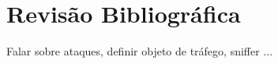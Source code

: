 \chapter[Revisão Bibliográfica]{Revisão Bibliográfica}
Falar sobre ataques, definir objeto de tráfego, sniffer ...
   

